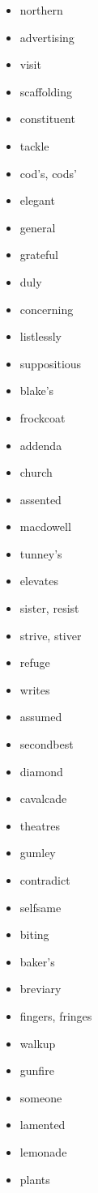 \documentclass{article}
\begin{document}
\begin{itemize}
    \item northern
    \item advertising
    \item visit
    \item scaffolding
    \item constituent
    \item tackle
    \item cod's, cods'
    \item elegant
    \item general
    \item grateful
    \item duly
    \item concerning
    \item listlessly
    \item suppositious
    \item blake's
    \item frockcoat
    \item addenda
    \item church
    \item assented
    \item macdowell
    \item tunney's
    \item elevates
    \item sister, resist
    \item strive, stiver
    \item refuge
    \item writes
    \item assumed
    \item secondbest
    \item diamond
    \item cavalcade
    \item theatres
    \item gumley
    \item contradict
    \item selfsame
    \item biting
    \item baker's
    \item breviary
    \item fingers, fringes
    \item walkup
    \item gunfire
    \item someone
    \item lamented
    \item lemonade
    \item plants

\end{itemize}
\end{document}
